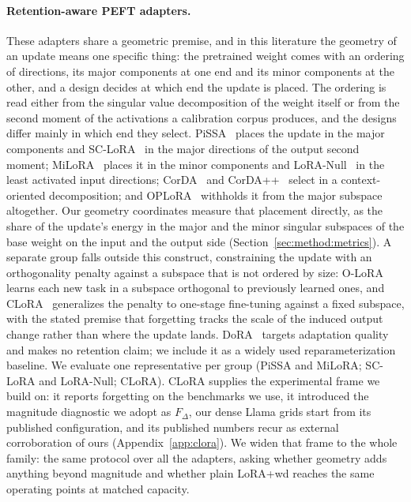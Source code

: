 \documentclass[11pt]{article}
\newcommand{\dw}{F_{\Delta}}
\begin{document}
\paragraph{Retention-aware PEFT adapters.} These adapters share a geometric
premise, and in this literature the geometry of an update means one specific
thing: the pretrained weight comes with an ordering of directions, its major
components at one end and its minor components at the other, and a design
decides at which end the update is placed. The ordering is read either from
the singular value decomposition of the weight itself or from the second
moment of the activations a calibration corpus produces, and the designs
differ mainly in which end they select. PiSSA~\citep{meng2024pissa} places the
update in the major components and SC-LoRA~\citep{luo2025sclora} in the major
directions of the output second moment; MiLoRA~\citep{wang2024milora} places
it in the minor components and LoRA-Null~\citep{tang2025loranull} in the least
activated input directions; CorDA~\citep{yang2024corda} and
CorDA++~\citep{yang2025cordapp} select in a context-oriented decomposition; and
OPLoRA~\citep{xiong2025oplora} withholds it from the major subspace
altogether. Our geometry coordinates measure that placement directly, as the
share of the update's energy in the major and the minor singular subspaces of
the base weight on the input and the output side
(Section~\ref{sec:method:metrics}). A separate group falls outside this
construct, constraining the update with an orthogonality penalty against a
subspace that is not ordered by size: O-LoRA~\citep{wang2023olora} learns each
new task in a subspace orthogonal to previously learned ones, and
CLoRA~\citep{clora} generalizes the penalty to one-stage fine-tuning against a
fixed subspace, with the stated premise that forgetting tracks the scale of
the induced output change rather than where the update lands. DoRA~\citep{liu2024dora} targets adaptation quality and
makes no retention claim; we include it as a widely used reparameterization
baseline. We evaluate one representative per group (PiSSA and MiLoRA;
SC-LoRA and LoRA-Null; CLoRA).
CLoRA supplies the experimental frame we build on: it reports forgetting on
the benchmarks we use, it introduced the magnitude diagnostic we adopt as
$\dw$, our dense Llama grids start from its published configuration, and
its published numbers recur as external corroboration of ours
(Appendix~\ref{app:clora}). We widen that frame to the whole family: the
same protocol over all the adapters, asking whether geometry adds anything
beyond magnitude and whether plain LoRA{+}wd reaches the same operating
points at matched capacity.
\end{document}
